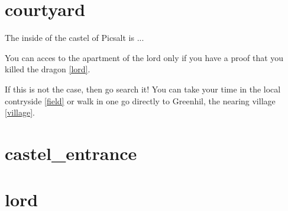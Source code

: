 \section{courtyard}

The inside of the castel of Picsalt is ...

You can acces to the apartment of the lord only if you have a proof that you
killed the dragon \ref{lord}.

If this is not the case, then go search it! You can take your time in the local
contryside \ref{field} or walk in one go directly to Greenhil, the nearing
village \ref{village}.

\section{castel_entrance}
\section{lord}
